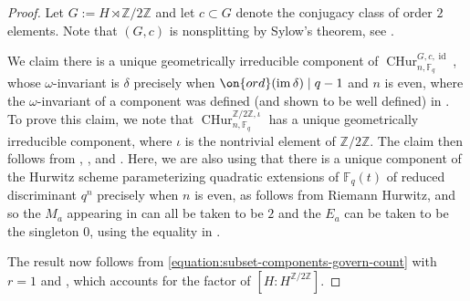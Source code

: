 \documentclass[12 pt]{amsart}
\theoremstyle{plain}
\theoremstyle{definition}
\theoremstyle{remark}
\numberwithin{equation}{section}
\DeclareMathOperator\id{id}
\DeclareMathOperator\im{im}
\newcommand{\cphur}[4]{\operatorname{CHur}^{#1, #3}_{#2, #4}}
\newcommand{\boundarycphur}[5]{\operatorname{CHur}^{#1, #3, #5}_{#2, #4}}
\begin{document}
\begin{proof}
	Let $G := H \rtimes \mathbb Z/2 \mathbb Z$ and let 
	$c \subset G$ denote the conjugacy class of order $2$ elements.
	Note that $(G,c)$ is nonsplitting by Sylow's theorem, see
	\cite[Lemma 3.2]{EllenbergVW:cohenLenstra}.

	We claim there is a unique 
	geometrically irreducible component of
	$\boundarycphur G n c {\mathbb F_q} {\id}$,
	whose $\omega$-invariant is $\delta$ precisely when $\on{ord}(\im
	\delta) \mid q -1$ and $n$ is even, where the $\omega$-invariant of a
	component was defined (and shown to be well defined) in
	\cite[Proposition
	4.3]{liu:non-abelian-cohen-lenstra-in-the-presence-of-roots}.
	To prove this claim, we note that
	$\cphur {\mathbb Z/2 \mathbb Z} {n} {\iota} {\mathbb
	F_q}$ has a unique geometrically irreducible component, where $\iota$ is
	the nontrivial element of $\mathbb Z/2 \mathbb Z$.
	The claim then follows from \cite[Lemma
	4.4]{liu:non-abelian-cohen-lenstra-in-the-presence-of-roots},
\cite[Lemma 4.5]{liu:non-abelian-cohen-lenstra-in-the-presence-of-roots},
and \cite[Proposition 12.7]{liuWZB:a-predicted-distribution}.
Here, we are also using that there is a unique component of the Hurwitz scheme
parameterizing quadratic extensions of $\mathbb F_q(t)$
of reduced discriminant $q^n$ precisely when $n$ is even, as follows from Riemann Hurwitz, and
so the $M_a$ appearing in 
\cite[Lemma 4.4]{liu:non-abelian-cohen-lenstra-in-the-presence-of-roots}
can all be taken to be $2$ and the $E_a$ can be taken to be the singleton $0$,
using the equality in \cite[Lemma
4.5]{liu:non-abelian-cohen-lenstra-in-the-presence-of-roots}.

	The result now follows from
	\eqref{equation:subset-components-govern-count} with $r =1$
	and \cite[Lemma
	4.6]{liu:non-abelian-cohen-lenstra-in-the-presence-of-roots}, which
	accounts for the factor of $[H: H^{\mathbb Z/2 \mathbb Z}]$.
\end{proof}
\end{document}
